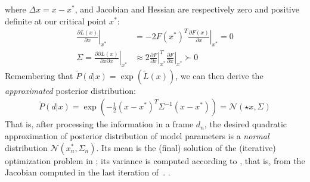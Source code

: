 %
where $\Delta x=x - x^*$, and Jacobian and Hessian are respectively zero and positive definite at our critical point $x^*$:
%
\begin{align}
\left.\tfrac{\partial L(x)}{\partial x} \right|_{x^*} &= - 2 F(x^*)^T 
\left.\tfrac{\partial F(x)}{\partial x}\right|_{x^*} = 0 
\label{eq:taylor-jacobian}
\\
\Sigma = \left. \tfrac{\partial \partial L(x)}{\partial x \partial x}  \right|_{x^*}  
& \approx 2
\left.\tfrac{\partial F}{\partial x}\right|_{x^*}^T  
\left.\tfrac{\partial F}{\partial x}\right|_{x^*}
\succ 0
\label{eq:taylor-hessian}
\end{align}
% 
Remembering that $\tilde P(d|x) = \exp (\tilde{L}(x))$, we can then derive the \emph{approximated} posterior distribution:
%
\begin{align}
\tilde{P}(d|x) = \exp\left(- \tfrac{1}{2}(x - x^*)^T \Sigma^{-1}  (x - x^*) \right) = \mathcal{N}\left(\star{x}, \Sigma \right)
\end{align}
%
That is, after processing the information in a frame $d_n$, the desired quadratic approximation of posterior distribution of model parameters is a \emph{normal} distribution $\mathcal{N}\left(x_n^*, \Sigma_n \right)$.
Its mean is the (final) solution of the (iterative) optimization problem in ; its variance is computed according to , that is, from the Jacobian computed in the last iteration of~. .

